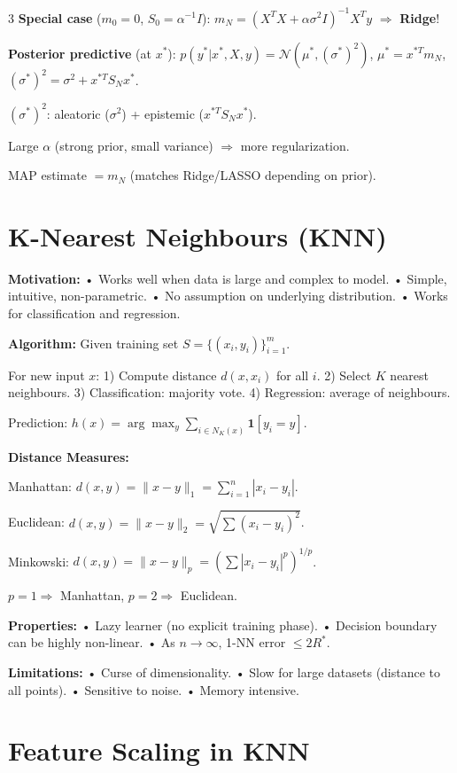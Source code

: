 \documentclass[8pt,fleqn]{extarticle}
\begin{document}
\begin{multicols}{3}
\textbf{Special case} ($m_0=0$, $S_0=\alpha^{-1}I$):
$m_N=(X^TX+\alpha\sigma^2 I)^{-1}X^Ty$ $\Rightarrow$ \textbf{Ridge}!

\textbf{Posterior predictive} (at $x^*$):
$p(y^*|x^*,X,y)=\mathcal N(\mu^*,(\sigma^*)^2)$,
$\mu^*=x^{*T}m_N$, $(\sigma^*)^2=\sigma^2+x^{*T}S_N x^*$.

$(\sigma^*)^2$: aleatoric ($\sigma^2$) + epistemic ($x^{*T}S_Nx^*$).

Large $\alpha$ (strong prior, small variance) $\Rightarrow$ more regularization.

MAP estimate $= m_N$ (matches Ridge/LASSO depending on prior).


\section*{K-Nearest Neighbours (KNN)}

\textbf{Motivation:}
• Works well when data is large and complex to model.
• Simple, intuitive, non-parametric.
• No assumption on underlying distribution.
• Works for classification and regression.

\textbf{Algorithm:}
Given training set $S=\{(x_i,y_i)\}_{i=1}^m$.

For new input $x$:
1) Compute distance $d(x,x_i)$ for all $i$.
2) Select $K$ nearest neighbours.
3) Classification: majority vote.
4) Regression: average of neighbours.

Prediction:
$h(x)=\arg\max_y \sum_{i\in N_K(x)} \mathbf{1}[y_i=y]$.

\textbf{Distance Measures:}

Manhattan:
$d(x,y)=\|x-y\|_1=\sum_{i=1}^n |x_i-y_i|$.

Euclidean:
$d(x,y)=\|x-y\|_2=\sqrt{\sum (x_i-y_i)^2}$.

Minkowski:
$d(x,y)=\|x-y\|_p=(\sum |x_i-y_i|^p)^{1/p}$.

$p=1 \Rightarrow$ Manhattan,
$p=2 \Rightarrow$ Euclidean.

\textbf{Properties:}
• Lazy learner (no explicit training phase).
• Decision boundary can be highly non-linear.
• As $n\to\infty$, 1-NN error $\le 2R^*$.

\textbf{Limitations:}
• Curse of dimensionality.
• Slow for large datasets (distance to all points).
• Sensitive to noise.
• Memory intensive.


\section*{Feature Scaling in KNN}


\end{multicols}
\end{document}
